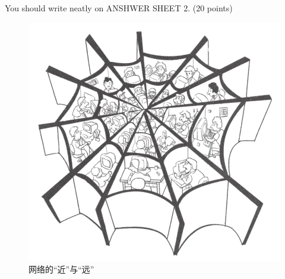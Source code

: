 You should write neatly on ANSHWER SHEET 2. (20 points)


\begin{figure}[h!]
	\centering
	\includegraphics[width=0.32\linewidth]{picture/2009.png}
	\caption*{网络的“近”与“远”}
\end{figure}


\checkpagenumber